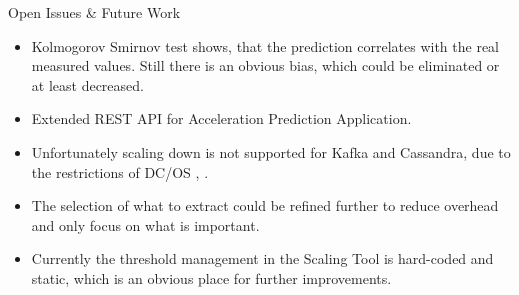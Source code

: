 \documentclass[10pt]{beamer}
\begin{document}
{ %
    \begin{frame}[plain]
     \end{frame}
}

\begin{frame}{Open Issues \& Future Work}
    \begin{itemize}
        \item Kolmogorov Smirnov test shows, that the prediction correlates with the real measured values. Still there is an obvious bias, which could be eliminated or at least decreased.
        \item Extended REST API for Acceleration Prediction Application.
        \item Unfortunately scaling down is not supported for Kafka and Cassandra, due to the restrictions of DC/OS \cite{mesosphere}, \cite{cassandra_limitations}.
        \item The selection of what to extract could be refined further to reduce overhead and only focus on what is important.
        \item Currently the threshold management in the Scaling Tool is hard-coded and static, which is an obvious place for further improvements.
    \end{itemize}
\end{frame}

\end{document}
